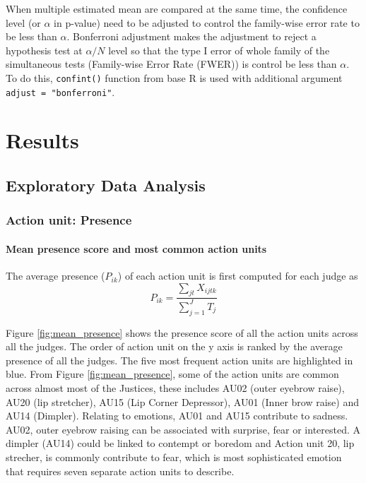 \documentclass{monashthesis}
\begin{document}
When multiple estimated mean are compared at the same time, the confidence level (or \(\alpha\) in p-value) need to be adjusted to control the family-wise error rate to be less than \(\alpha\). Bonferroni adjustment makes the adjustment to reject a hypothesis test at \(\alpha/N\) level so that the type I error of whole family of the simultaneous tests (Family-wise Error Rate (FWER)) is control be less than \(\alpha\). To do this, \texttt{confint()} function from base R is used with additional argument \texttt{adjust\ =\ "bonferroni"}.

\let\cleardoublepage\clearpage

\hypertarget{results}{%
\chapter{Results}\label{results}}

\hypertarget{exploratory-data-analysis}{%
\section{Exploratory Data Analysis}\label{exploratory-data-analysis}}

\hypertarget{action-unit-presence}{%
\subsection{Action unit: Presence}\label{action-unit-presence}}

\hypertarget{mean-presence-score-and-most-common-action-units}{%
\subsubsection{Mean presence score and most common action units}\label{mean-presence-score-and-most-common-action-units}}

The average presence (\(P_{ik}\)) of each action unit is first computed for each judge as \[P_{ik} = \frac{\sum_{jt}X_{ijtk}}{\sum_{j = 1}^JT_j}\]

\noindent Figure \ref{fig:mean_presence} shows the presence score of all the action units across all the judges. The order of action unit on the y axis is ranked by the average presence of all the judges. The five most frequent action units are highlighted in blue. From Figure \ref{fig:mean_presence}, some of the action units are common across almost most of the Justices, these includes AU02 (outer eyebrow raise), AU20 (lip stretcher), AU15 (Lip Corner Depressor), AU01 (Inner brow raise) and AU14 (Dimpler). Relating to emotions, AU01 and AU15 contribute to sadness. AU02, outer eyebrow raising can be associated with surprise, fear or interested. A dimpler (AU14) could be linked to contempt or boredom and Action unit 20, lip strecher, is commonly contribute to fear, which is most sophisticated emotion that requires seven separate action units to describe.
\end{document}
